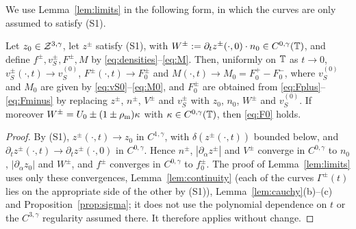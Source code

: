 We use Lemma~\ref{lem:limits} in the following form, in which the curves are only assumed to satisfy (S1).

\begin{lemma}\label{x:lem-limits-S1}
Let $z_0\in\mathcal{Z}^{3,\gamma}$, let $z^\pm$ satisfy (S1), with $W^\pm:=\partial_tz^\pm(\cdot,0)\cdot n_0\in C^{0,\gamma}(\mathbb{T})$, and define $f^\pm,v_S^\pm,F^\pm,M$ by
\eqref{eq:densities}--\eqref{eq:M}. Then, uniformly on $\mathbb{T}$ as $t\to0$, $v_S^\pm(\cdot,t)\to v_S^{(0)}$, $F^\pm(\cdot,t)\to F_0^\pm$ and $M(\cdot,t)\to M_0=F_0^+-F_0^-$, where $v_S^{(0)}$ and
$M_0$ are given by \eqref{eq:vS0}--\eqref{eq:M0}, and $F_0^\pm$ are obtained from \eqref{eq:Fplus}--\eqref{eq:Fminus} by replacing $z^\pm$, $n^\pm$, $V^\pm$ and $v_S^\pm$ with $z_0$, $n_0$,
$W^\pm$ and $v_S^{(0)}$. If moreover $W^\pm=U_0\pm(1\pm\rho_{\mathrm m})\kappa$ with $\kappa\in C^{0,\gamma}(\mathbb{T})$, then \eqref{eq:F0} holds.
\end{lemma}

\begin{proof}
By (S1), $z^\pm(\cdot,t)\to z_0$ in $C^{1,\gamma}$, with $\delta(z^\pm(\cdot,t))$ bounded below, and $\partial_tz^\pm(\cdot,t)\to\partial_tz^\pm(\cdot,0)$ in $C^{0,\gamma}$. Hence $n^\pm$,
$|\partial_\alpha z^\pm|$ and $V^\pm$ converge in $C^{0,\gamma}$ to $n_0$, $|\partial_\alpha z_0|$ and $W^\pm$, and $f^\pm$ converges in $C^{0,\gamma}$ to $f_0^\pm$. The proof of
Lemma~\ref{lem:limits} uses only these convergences, Lemma~\ref{lem:continuity} (each of the curves $\Gamma^\pm(t)$ lies on the appropriate side of the other by (S1)), Lemma~\ref{lem:cauchy}(b)--(c)
and Proposition~\ref{prop:sigma}; it does not use the polynomial dependence on $t$ or the $C^{3,\gamma}$ regularity assumed there. It therefore applies without change.
\end{proof}

